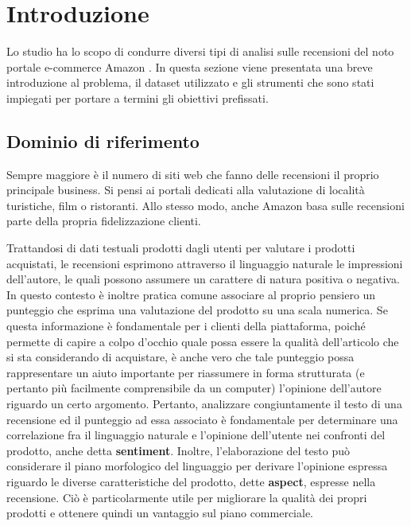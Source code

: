 \documentclass[hidelinks, 12pt]{article}
\begin{document}
\tableofcontents
\clearpage
\listoffigures
\listoftables
\pagebreak





\section{Introduzione}


Lo studio ha lo scopo di condurre diversi tipi di analisi sulle recensioni del noto portale e-commerce Amazon \cite{site:amazon}. In questa sezione viene presentata una breve introduzione al problema, il dataset utilizzato e gli strumenti che sono stati impiegati per portare a termini gli obiettivi prefissati.



\subsection{Dominio di riferimento}

Sempre maggiore è il numero di siti web che fanno delle recensioni il proprio principale business. Si pensi ai portali dedicati alla valutazione di località turistiche, film o ristoranti. Allo stesso modo, anche Amazon basa sulle recensioni parte della propria fidelizzazione clienti.

Trattandosi di dati testuali prodotti dagli utenti per valutare i prodotti acquistati, le recensioni esprimono attraverso il linguaggio naturale le impressioni dell'autore, le quali possono assumere un carattere di natura positiva o negativa. In questo contesto è inoltre pratica comune associare al proprio pensiero un punteggio che esprima una valutazione del prodotto su una scala numerica. Se questa informazione è fondamentale per i clienti della piattaforma, poiché permette di capire a colpo d'occhio quale possa essere la qualità dell'articolo che si sta considerando di acquistare, è anche vero che tale punteggio possa rappresentare un aiuto importante per riassumere in forma strutturata (e pertanto più facilmente comprensibile da un computer) l'opinione dell'autore riguardo un certo argomento. Pertanto, analizzare congiuntamente il testo di una recensione ed il punteggio ad essa associato è fondamentale per determinare una correlazione fra il linguaggio naturale e l'opinione dell'utente nei confronti del prodotto, anche detta \textbf{sentiment}. Inoltre, l'elaborazione del testo può considerare il piano morfologico del linguaggio per derivare l'opinione espressa riguardo le diverse caratteristiche del prodotto, dette \textbf{aspect}, espresse nella recensione. Ciò è particolarmente utile per migliorare la qualità dei propri prodotti e ottenere quindi un vantaggio sul piano commerciale.
\end{document}
